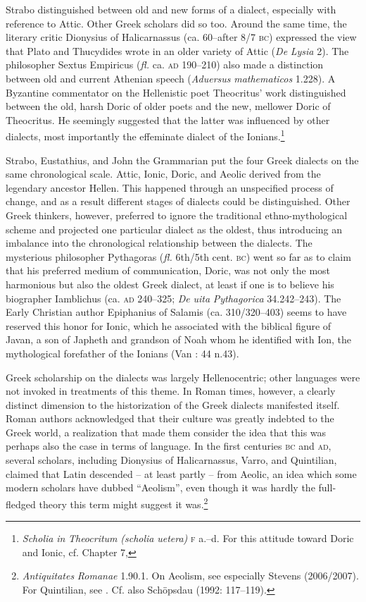 Strabo distinguished between old and new forms of a dialect, especially with reference to Attic. Other Greek scholars did so too. Around the same time, the literary critic Dionysius of Halicarnassus (ca. 60–after 8/7 \textsc{bc}) expressed the view that Plato and Thucydides wrote in an older variety of Attic (\textit{De} \textit{Lysia} 2). The philosopher Sextus Empiricus (\textit{fl.} ca. \textsc{ad} 190–210) also made a distinction between old and current Athenian speech (\textit{Aduersus} \textit{mathematicos} 1.228). A Byzantine commentator on the Hellenistic poet Theocritus’ work distinguished between the old, harsh Doric of older poets and the new, mellower Doric of Theocritus. He seemingly suggested that the latter was influenced by other dialects, most importantly the effeminate dialect of the Ionians.\footnote{\textit{Scholia} \textit{in} \textit{Theocritum} \textit{(scholia} \textit{uetera)} \textsc{f} a.–d. For this attitude toward Doric and Ionic, cf. Chapter 7, }

Strabo, Eustathius, and John the Grammarian put the four Greek dialects on the same chronological scale. Attic, Ionic, Doric, and Aeolic derived from the legendary ancestor Hellen. This happened through an unspecified process of change, and as a result different stages of dialects could be distinguished. Other Greek thinkers, however, preferred to ignore the traditional ethno-mythological scheme and projected one particular dialect as the oldest, thus introducing an imbalance into the chronological relationship between the dialects. The mysterious philosopher Pythagoras (\textit{fl.} 6th/5th cent. \textsc{bc}) went so far as to claim that his preferred medium of communication, Doric, was not only the most harmonious but also the oldest Greek dialect, at least if one is to believe his biographer Iamblichus (ca. \textsc{ad} 240–325; \textit{De} \textit{uita} \textit{Pythagorica} 34.242–243). The Early Christian author Epiphanius of Salamis (ca. 310/320–403) seems to have reserved this honor for Ionic, which he associated with the biblical figure of Javan, a son of Japheth and grandson of Noah whom he identified with Ion, the mythological forefather of the Ionians (Van \citealt{Rooy2013}: 44 n.43).

Greek scholarship on the dialects was largely Hellenocentric; other languages were not invoked in treatments of this theme. In Roman times, however, a clearly distinct dimension to the historization of the Greek dialects manifested itself. Roman authors acknowledged that their culture was greatly indebted to the Greek world, a realization that made them consider the idea that this was perhaps also the case in terms of language. In the first centuries \textsc{bc} and \textsc{ad}, several scholars, including Dionysius of Halicarnassus, Varro, and Quintilian, claimed that Latin descended – at least partly – from Aeolic, an idea which some modern scholars have dubbed “Aeolism”, even though it was hardly the full-fledged theory this term might suggest it was.\footnote{\textit{Antiquitates} \textit{Romanae} 1.90.1. On Aeolism, see especially Stevens (2006/2007). For Quintilian, see \citet[149]{Fögen2000}. Cf. also Schöpsdau (1992: 117–119).}


